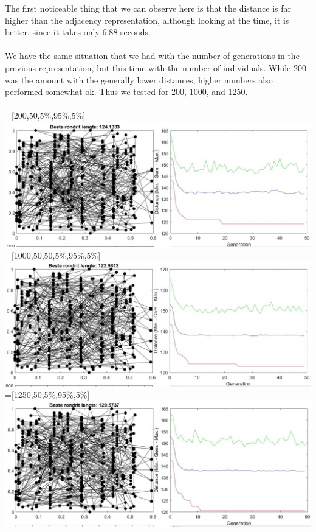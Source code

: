 The first noticeable thing that we can observe here is that the distance
is far higher than the adjacency representation, although looking at the
time, it is better, since it takes only 6.88 seconds.\\
\\
We have the same situation that we had with the number of generations in the
previous representation, but this time with the number of individuals. While
200 was the amount with the generally lower distances, higher numbers also
performed somewhat ok. Thus we tested for 200, 1000, and 1250.\\
\\
 =[200,50,5\%,95\%,5\%]\\
\includegraphics[width=\textwidth]{img/specific/order_crossover/general_2.jpg}\\
 =[1000,50,50,5\%,95\%,5\%] \\
\includegraphics[width=\textwidth]{img/specific/order_crossover/general_3.jpg}\\
 =[1250,50,5\%,95\%,5\%]\\
\includegraphics[width=\textwidth]{img/specific/order_crossover/general_4.jpg}\\
